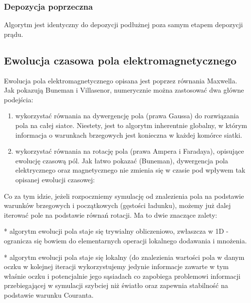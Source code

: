     \subsubsection{Depozycja poprzeczna}
    Algorytm jest identyczny do depozycji podłużnej poza samym etapem depozycji prądu.


    \subsection{Ewolucja czasowa pola elektromagnetycznego} 

    Ewolucja pola elektromagnetycznego opisana jest poprzez równania Maxwella.
    Jak pokazują Buneman i Villasenor, numerycznie można zastosować dwa główne
    podejścia: 

    \begin{enumerate}
        \item wykorzystać równania na dywergencję pola (prawa Gaussa) do
        rozwiązania pola na całej siatce. Niestety, jest to algorytm
        inherentnie globalny, w którym informacja o warunkach brzegowych
        jest konieczna w każdej komórce siatki.

        \item wykorzystać równania na rotację pola (prawa Ampera i Faradaya),
        opisujące ewolucję czasową pól. Jak łatwo pokazać (Buneman), dywergencja
        pola elektrycznego oraz magnetycznego nie zmienia się w czasie pod
        wpływem tak opisanej ewolucji czasowej:
    \end{enumerate}

    Co za tym idzie, jeżeli rozpoczniemy symulację od znalezienia pola na
    podstawie warunków brzegowych i początkowych (gęstości ładunku), możemy już
    dalej iterować pole na podstawie równań rotacji. Ma to dwie znaczące
    zalety:

    * algorytm ewolucji pola staje się trywialny obliczeniowo,
    zwłaszcza w 1D - ogranicza się bowiem do elementarnych operacji lokalnego
    dodawania i mnożenia.

    * algorytm ewolucji pola staje się lokalny (do
    znalezienia wartości pola w danym oczku w kolejnej iteracji wykorzystujemy
    jedynie informacje zawarte w tym właśnie oczku i potencjalnie jego
    sąsiadach  co zapobiega
    problemowi informacji przebiegającej w symulacji szybciej niż światło oraz
    zapewnia stabilność na podstawie
    warunku Couranta.

